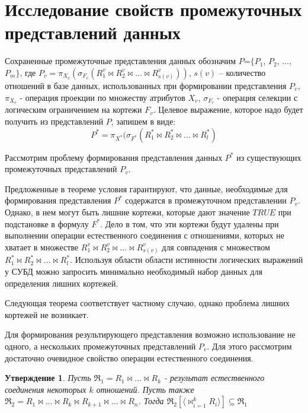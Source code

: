 \documentclass[10pt,a4paper]{article}
\newtheorem{statement}{Утверждение}
\def \n #1{\mathit{#1}}
\begin{document}
\section{Исследование свойств промежуточных представлений данных}

Сохраненные промежуточные представления данных обозначим $P$=$\{ P_1$, $P_2$, $\dots$, $P_m \}$,
где $P_v = \pi_{X_v}(\sigma_{F_v} (R^v_1 \Join R^v_2 \Join \dots \Join R^v_{s(v)} ))$,
$s(v)$ – количество отношений в базе данных, использованных при формировании представления $P_v$,
$\pi_{X_v}$ - операция проекции по множеству атрибутов $X_v$, $\sigma_{F_v}$ - операция селекции
с логическим ограничением на кортежи $F_v$.
Целевое выражение, которое надо будет получить из представлений $P$, запишем в виде:
$$P^{\ast} = \pi_{X^{\ast}}(\sigma_{F^{\ast}} (R^{\ast}_1 \Join R^{\ast}_2\Join \dots \Join R^{\ast}_l )$$

Рассмотрим проблему формирования представления данных $P^{\ast}$ из существующих промежуточных
представлений $P_v$.



Предложенные в теореме условия гарантируют, что данные, необходимые для формирования
представления $P^{\ast}$ содержатся в промежуточном представлении $P_v$. Однако, в нем
могут быть лишние кортежи, которые дают значение $\n{TRUE}$ при подстановке в формулу
$F^{\ast}$. Дело в том, что эти кортежи будут удалены при выполнении операции естественного
соединения с отношениями, которых не хватает в множестве $R^v_1 \Join R^v_2 \Join \dots \Join R^v_{s(v)} $
для совпадения с множеством $R^{\ast}_1 \Join R^{\ast}_2\Join \dots \Join R^{\ast}_l $.
Используя области области истинности логических выражений у СУБД можно запросить
минимально необходимый набор данных для определения лишних кортежей.

Следующая теорема соответствует частному случаю, однако проблема лишних кортежей не возникает.



Для формирования результирующего представления возможно использование
не одного, а нескольких промежуточных представлений $P_v$. Для этого
рассмотрим достаточно очевидное свойство операции естественного соединения.

\begin{statement}
Пусть $\Re_1 = R_1 \Join \dots \Join R_k$ - результат естественного
соединения некоторых $k$ отношений. Пусть также $\Re_2 = R_1 \Join \dots
\Join R_k \Join R_{k+1} \Join \dots \Join R_{n}$. 
Тогда $\Re_2 [\langle \Join_{i=1}^{k} R_i \rangle] \subseteq \Re_1$
\label{join_property}
\end{statement}
\end{document}

